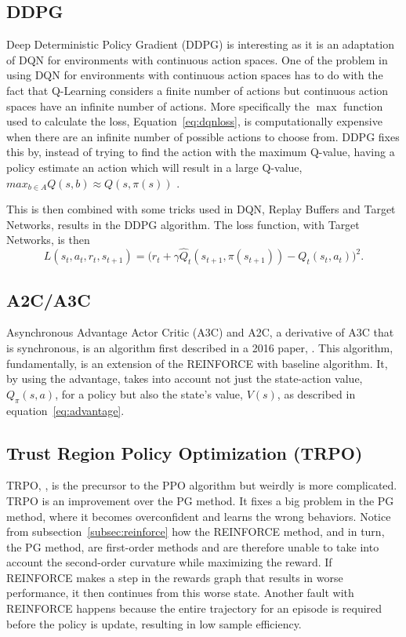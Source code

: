 \subsection{DDPG}

Deep Deterministic Policy Gradient (DDPG) is interesting as it is an adaptation of DQN for environments with continuous action spaces. One of the problem in using DQN for environments with continuous action spaces has to do with the fact that Q-Learning considers a finite number of actions but continuous action spaces have an infinite number of actions. More specifically the $\max$ function used to calculate the loss, Equation~\ref{eq:dqnloss}, is computationally expensive when there are an infinite number of possible actions to choose from. DDPG fixes this by, instead of trying to find the action with the maximum Q-value, having a policy estimate an action which will result in a large Q-value, $max_{b\in A} Q(s,b)\approx Q(s, \pi(s))$ \cite{lillicrap_hunt_pritzel_heess_erez_tassa_silver_wierstra_2015}.

This is then combined with some tricks used in DQN, Replay Buffers and Target Networks, results in the DDPG algorithm. The loss function, with Target Networks, is then $$L(s_t, a_t, r_t, s_{t+1})=\big(r_t+\gamma \hat{Q}_t(s_{t+1},\pi(s_{t+1}))-Q_t(s_t,a_t)\big)^2.$$

\subsection{A2C/A3C}

Asynchronous Advantage Actor Critic (A3C) and A2C, a derivative of A3C that is synchronous, is an algorithm first described in a 2016 paper, \cite{mnih_badia_mirza_graves_harley_lillicrap_silver_kavukcuoglu_2016}. This algorithm, fundamentally, is an extension of the REINFORCE with baseline algorithm. It, by using the advantage, takes into account not just the state-action value, $Q_\pi (s, a)$, for a policy but also the state's value, $V(s)$, as described in equation~\ref{eq:advantage}. 

\subsection{Trust Region Policy Optimization (TRPO)}

TRPO, \cite{schulman_levine_mortiz_jordan_abbeel_2015}, is the precursor to the PPO algorithm but weirdly is more complicated. TRPO is an improvement over the PG method. It fixes a big problem in the PG method, where it becomes overconfident and learns the wrong behaviors. Notice from subsection~\ref{subsec:reinforce} how the REINFORCE method, and in turn, the PG method, are first-order methods and are therefore unable to take into account the second-order curvature while maximizing the reward. If REINFORCE makes a step in the rewards graph that results in worse performance, it then continues from this worse state. Another fault with REINFORCE happens because the entire trajectory for an episode is required before the policy is update, resulting in low sample efficiency. 

